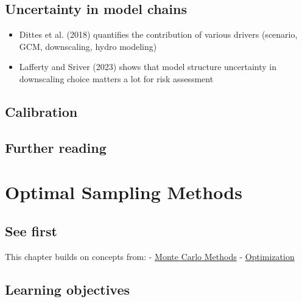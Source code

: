 \documentclass[
  letterpaper,
  DIV=11,
  numbers=noendperiod]{scrreprt}
\providecommand{\tightlist}{%
  \setlength{\itemsep}{0pt}\setlength{\parskip}{0pt}}
\begin{document}
\section{Uncertainty in model chains}\label{uncertainty-in-model-chains}

\begin{itemize}
\tightlist
\item
  Dittes et al. (2018) quantifies the contribution of various drivers
  (scenario, GCM, downscaling, hydro modeling)
\item
  Lafferty and Sriver (2023) shows that model structure uncertainty in
  downscaling choice matters a lot for risk assessment
\end{itemize}

\section{Calibration}\label{calibration}

\section*{Further reading}\label{further-reading-10}


\chapter{Optimal Sampling Methods 🚧}\label{optimal-sampling-methods}

\section*{See first}\label{see-first-7}


This chapter builds on concepts from: -
\href{./chapters/fundamentals/monte-carlo.qmd}{Monte Carlo Methods} -
\href{./chapters/fundamentals/optimization.qmd}{Optimization}

\section*{Learning objectives}\label{learning-objectives-11}

\end{document}
